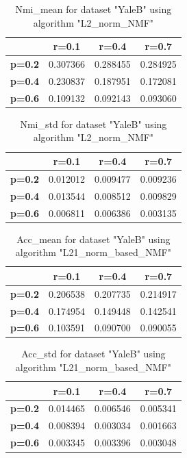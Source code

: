 \begin{table}[p]
\centering
\begin{tabular}{|c|c|c|c|}
\hline
 & \textbf{r=0.1} & \textbf{r=0.4} & \textbf{r=0.7} \\
\hline
\textbf{p=0.2} & 0.307366 & 0.288455 & 0.284925 \\
\hline
\textbf{p=0.4} & 0.230837 & 0.187951 & 0.172081 \\
\hline
\textbf{p=0.6} & 0.109132 & 0.092143 & 0.093060 \\
\hline
\end{tabular}
\caption{Nmi\_mean for dataset "YaleB" using algorithm "L2\_norm\_NMF"}
\end{table}

\begin{table}[p]
\centering
\begin{tabular}{|c|c|c|c|}
\hline
 & \textbf{r=0.1} & \textbf{r=0.4} & \textbf{r=0.7} \\
\hline
\textbf{p=0.2} & 0.012012 & 0.009477 & 0.009236 \\
\hline
\textbf{p=0.4} & 0.013544 & 0.008512 & 0.009829 \\
\hline
\textbf{p=0.6} & 0.006811 & 0.006386 & 0.003135 \\
\hline
\end{tabular}
\caption{Nmi\_std for dataset "YaleB" using algorithm "L2\_norm\_NMF"}
\end{table}

\begin{table}[p]
\centering
\begin{tabular}{|c|c|c|c|}
\hline
 & \textbf{r=0.1} & \textbf{r=0.4} & \textbf{r=0.7} \\
\hline
\textbf{p=0.2} & 0.206538 & 0.207735 & 0.214917 \\
\hline
\textbf{p=0.4} & 0.174954 & 0.149448 & 0.142541 \\
\hline
\textbf{p=0.6} & 0.103591 & 0.090700 & 0.090055 \\
\hline
\end{tabular}
\caption{Acc\_mean for dataset "YaleB" using algorithm "L21\_norm\_based\_NMF"}
\end{table}

\begin{table}[p]
\centering
\begin{tabular}{|c|c|c|c|}
\hline
 & \textbf{r=0.1} & \textbf{r=0.4} & \textbf{r=0.7} \\
\hline
\textbf{p=0.2} & 0.014465 & 0.006546 & 0.005341 \\
\hline
\textbf{p=0.4} & 0.008394 & 0.003034 & 0.001663 \\
\hline
\textbf{p=0.6} & 0.003345 & 0.003396 & 0.003048 \\
\hline
\end{tabular}
\caption{Acc\_std for dataset "YaleB" using algorithm "L21\_norm\_based\_NMF"}
\end{table}

